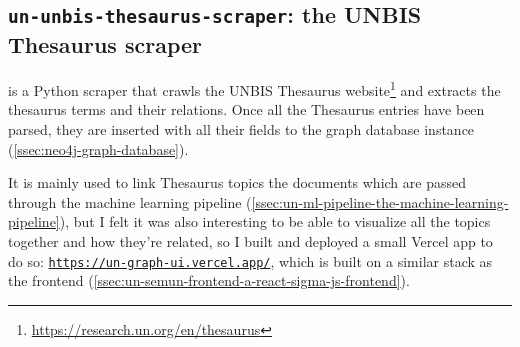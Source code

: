 
\subsection{\texttt{un-unbis-thesaurus-scraper}: the UNBIS Thesaurus scraper} \label{ssec:un-unbis-thesaurus-scraper-the-unbis-thesaurus-scraper}

 is a Python scraper that crawls the UNBIS Thesaurus website\footnote{\url{https://research.un.org/en/thesaurus}} and extracts the thesaurus terms and their relations. Once all the Thesaurus entries have been parsed, they are inserted with all their fields to the graph database instance (\ref{ssec:neo4j-graph-database}).

It is mainly used to link Thesaurus topics the documents which are passed through the machine learning pipeline (\ref{ssec:un-ml-pipeline-the-machine-learning-pipeline}), but I felt it was also interesting to be able to visualize all the topics together and how they're related, so I built and deployed a small Vercel app to do so: \href{https://un-graph-ui.vercel.app/}{\faCloud{} \texttt{https://un-graph-ui.vercel.app/}}, which is built on a similar stack as the frontend (\ref{ssec:un-semun-frontend-a-react-sigma-js-frontend}).
